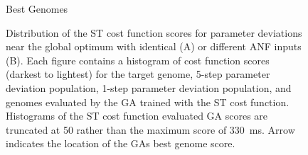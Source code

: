  \begin{figure}[thb!]
 \caption{Best Genomes}
     \label{fig:GA:8}
 \end{figure}

  \begin{figure}[htb]
    \centering
    \caption{Distribution of the ST cost function scores for parameter
      deviations near the global optimum with identical (A) or
      different {ANF} inputs (B). Each figure contains a histogram of
      cost function scores (darkest to lightest) for the target
      genome, 5-step parameter deviation population, 1-step parameter
      deviation population, and genomes evaluated by the {GA} trained
      with the ST cost function.  Histograms of the ST cost function
      evaluated {GA} scores are truncated at 50 rather than the maximum
      score of 330~ms.  Arrow indicates the location of the {GA}s best
      genome score.}
    \label{fig:GA:9}
  \end{figure}



